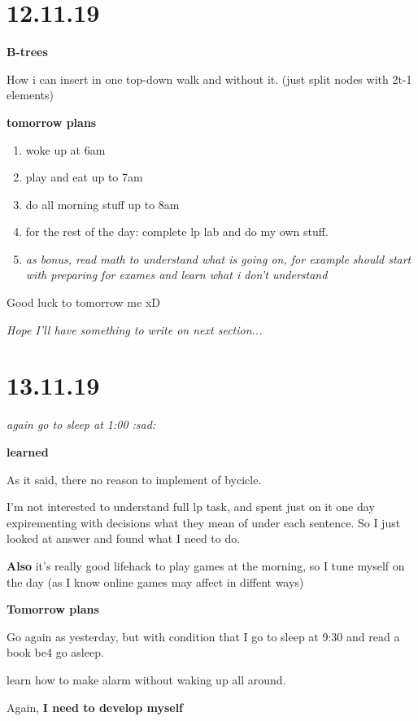 \documentclass[12pt,a4paper,titlepage]{article}
\begin{document}
\newpage
\section{12.11.19}
\begin{center}
  \textbf{B-trees}
\end{center}
How i can insert in one top-down walk and without it. (just split nodes
with 2t-1 elements)
\begin{center}
  \textbf{tomorrow plans} 
\end{center}
\begin{enumerate}
  \item woke up at 6am
  \item play and eat up to 7am
  \item do all morning stuff up to 8am
  \item for the rest of the day: complete lp lab and do my own stuff.
  \item \textit{as bonus, read math to understand what is going on, for
    example should start with preparing for exames and learn what i
  don't understand}
\end{enumerate}
\par Good luck to tomorrow me xD
\par \textit{Hope I'll have something to write on next section...}

\newpage
\section{13.11.19}
\textit{again go to sleep at 1:00 :sad:}
\begin{center}
  \textbf{learned}
\end{center}
As it said, there no reason to implement of bycicle.\par
I'm not interested to understand full lp task, and spent just on it one
day expirementing with decisions what they mean of under each sentence.
So I just looked at answer and found what I need to do.\par
\textbf{Also} it's really good lifehack to play games at the morning, so
I tune myself on the day (as I know online games may affect in diffent
ways)
\begin{center}
  \textbf{Tomorrow plans}
\end{center}
Go again as yesterday, but with condition that I go to sleep at 9:30 and
read a book be4 go asleep.\par
learn how to make alarm without waking up all around.
\par Again, \textbf{I need to develop myself}
\end{document}
